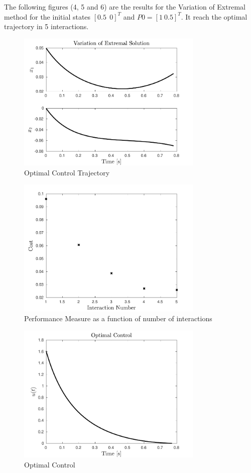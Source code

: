 \documentclass{article}
\begin{document}
The following figures (4, 5 and 6) are the results for the Variation of Extremal method for the initial states $[0.5 \:\: 0]^T$ and $P0 = [1 \: 0.5]^T$. It reach the optimal trajectory in 5 interactions. 

\begin{figure}[H]
\centering
\includegraphics [width=3.5in]{fig4}
\caption{Optimal Control Trajectory}
\end{figure}

\begin{figure}[H]
\centering
\includegraphics [width=3.5in]{fig5}
\caption{Performance Measure as a function of number of interactions}
\end{figure}

\begin{figure}[H]
\centering
\includegraphics [width=3.5in]{fig6}
\caption{Optimal Control}
\end{figure}
\end{document}
